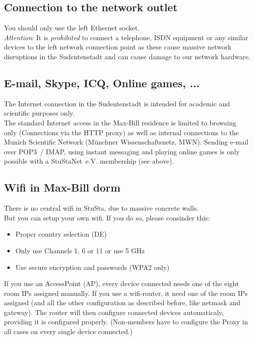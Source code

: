 \documentclass[a4paper,12pt]{scrartcl}
\begin{document}
\subsection*{Connection to the network outlet}

You should only use the left Ethernet socket.
\\
\emph{Attention}: It is \emph{prohibited} to connect a telephone, ISDN equipment or any similar devices to the left network connection point as these cause massive network disruptions in the Sudentenstadt and can cause damage to our network hardware.

\subsection*{E-mail, Skype, ICQ, Online games, ...}

The Internet connection in the Sudentenstadt is intended for academic and scientific purposes only.
\\
The standard Internet access in the Max-Bill residence is limited to browsing only (Connections via the HTTP proxy) as well as internal connections to the Munich Scientific Network (Münchner Wissenschaftsnetz, MWN). Sending e-mail over POP3~/ IMAP, using instant messaging and playing online games is only possible with a StuStaNet~e.V. membership (see above).

\newpage
\subsection*{Wifi in Max-Bill dorm}
There is no central wifi in StuSta, due to massive concrete walls.
\\
But you can setup your own wifi. If you do so, please consinder this:
\begin{itemize}
    \item Proper country selection (DE)
    \item Only use Channels 1, 6 or 11 or use 5 GHz
    \item Use secure encryption and passwords (WPA2 only)
\end{itemize}
If you use an AccessPoint (AP), every device connected needs one of the eight room IPs assigned manually. If you use a wifi-router, it need one of the room IPs assigned (and all the other configuration as described before, like netmask and gateway). The router will then configure connected devices automaticaly, providing it is configured properly. (Non-members have to configure the Proxy in all cases on every single device connected.)
\end{document}
